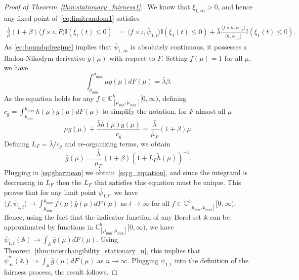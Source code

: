 \documentclass[a4paper,11pt,twoside]{article}
\numberwithin{equation}{section}
\numberwithin{figure}{section}
\theoremstyle{plain}
\newcommand{\AAA}{\mathbb{A}}
\newcommand{\CC}{\mathbb{C}}
\newcommand{\II}{\mathbb{I}}
\newcommand{\1}{\mathbbm{1}}
\begin{document}
\begin{proof}[Proof of Theorem~\ref{thm:stationary_fairness1}.]
We know that $\xi_{1,\infty}>0$, and hence any fixed point of~\eqref{eq:limitrandom1} satisfies 
\begin{align}
\frac{\bar{\lambda}}{\bar{\mu}}(1+\beta)\langle f\times \iota, F\rangle \II(\xi_{1}(t)\leq 0)&= \langle f\times \iota, \bar{\psi}_{1,t}\rangle \II(\xi_{1}(t)\leq 0) +\bar{\lambda}\frac{\langle f\times h, \bar{\psi}_{1,t}\rangle }{\langle h, \bar{\psi}_{1,t}\rangle}\II(\xi_{1}(t)\leq 0).
\label{eq:stationarypoint}
\end{align}
As \eqref{eq:boundqdregime} implies that $
\bar{\psi}_{1,\infty}$ is absolutely continuous, it possesses a Radon-Nikodym derivative $\bar{g}(\mu)$ with respect to $F$. Setting $f(\mu)=1$ for all $\mu$, we have
\begin{equation}
\int_{\mu_{\min}}^{\mu_{\max}}\mu \bar{g}(\mu)dF(\mu)=\bar{\lambda}\beta.
\label{eq:gbarmean}
\end{equation}
As the equation holds for any $f\in \CC_{[\mu_{\min},\mu_{\max}]}^b[0,\infty)$, defining $c_g=\int_{\mu_{\min}}^{\mu_{\max}}h(\mu) \bar{g}(\mu)dF(\mu)$ to simplify the notation, for $F$-almost all $\mu$
\[
\mu \bar{g}(\mu) +\frac{\bar{\lambda}h(\mu)\bar{g}(\mu)}{c_g}=\frac{\bar{\lambda}}{\bar{\mu}_F}(1+\beta)\mu.
\]
Defining $L_F=\bar{\lambda}/c_g$ and re-organizing terms, we obtain 
\begin{equation}
    \bar{g}(\mu)=\frac{\bar{\lambda}}{\bar{\mu}_F}(1+\beta)(1+L_F\tilde{h}(\mu))^{-1}.\label{eq:gbar_equation}
\end{equation}
Plugging in \eqref{eq:gbarmean} we obtain~\eqref{eq:g_equation}, and since the integrand is decreasing in $L_F$ then the $L_F$ that satisfies this equation must be unique. This proves that for any limit point $\bar{\psi}_{1,t}$, we have $\langle f, \bar{\psi}_{1,t}\rangle \to \int_{\mu_{\min}}^{\mu_{\max}} f(\mu)\bar{g}(\mu)dF(\mu)$ as $t\to\infty$ for all $f\in \CC_{[\mu_{\min},\mu_{\max}]}^b[0,\infty)$. Hence, using the fact that the indicator function of any Borel set $\AAA$ can be approximated by functions in $\CC_{[\mu_{\min},\mu_{\max}]}^b[0,\infty)$, we have 
$\bar{\psi}_{1,t}(\AAA)\to \int_\AAA \bar{g}(\mu)dF(\mu)$. Using Theorem~\ref{thm:interchangibility_stationary_n}, this implies that $\bar{\psi}_\infty^n(\AAA)\Rightarrow \int_\AAA \bar{g}(\mu)dF(\mu)$ as $n\to \infty$. Plugging $
\bar{\psi}_{1,t}$ into the definition of the fairness process, the result follows. \end{proof}
\end{document}
